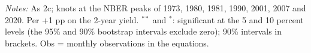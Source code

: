 \begin{flushleft}\footnotesize\textit{Notes:} As 2c; knots at the NBER peaks of 1973, 1980, 1981, 1990, 2001, 2007 and 2020. Per +1 pp on the 2-year yield. $^{**}$ and $^{*}$: significant at the 5 and 10 percent levels (the 95\% and 90\% bootstrap intervals exclude zero); 90\% intervals in brackets. Obs = monthly observations in the equations.\end{flushleft}
\endgroup
